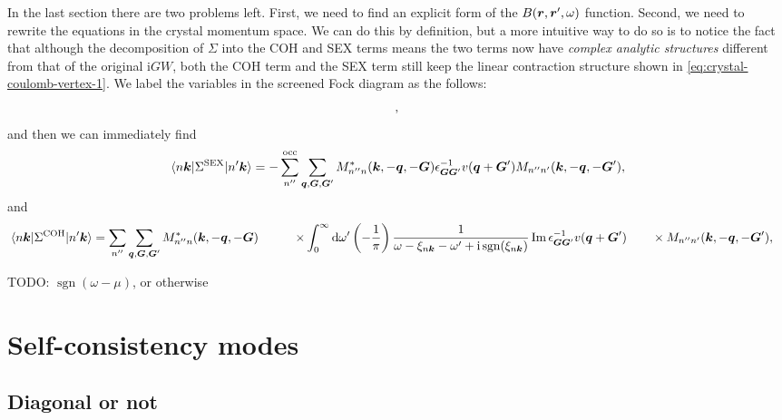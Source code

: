 \documentclass[hyperref, a4paper, 12pt]{report}
\DeclareMathOperator{\sgn}{sgn}
\newcommand*{\ii}{\mathrm{i}}
\def\\{}%
\begin{document}
In the last section there are two problems left.
First, we need to find an explicit form of the $B(\vb*{r}, \vb*{r}', \omega)$ function.
Second, we need to rewrite the equations in the 
crystal momentum space. 
We can do this by definition,
but a more intuitive way to do so 
is to notice the fact that although 
the decomposition of $\Sigma$ into the COH and SEX terms 
means the two terms now have \emph{complex analytic structures} 
different from that of the original $\ii G W$,
both the COH term and the SEX term 
still keep the linear contraction structure 
shown in \eqref{eq:crystal-coulomb-vertex-1}.
We label the variables in the screened Fock diagram as the follows: 
\[
    \protect,
\]
and then we can immediately find 
\begin{equation}
    \mel{n \vb*{k}}{\Sigma^{\text{SEX}}}{n' \vb*{k}}
    = - \sum_{n''}^{\text{occ}} \sum_{\vb*{q}, \vb*{G}, \vb*{G}'}
    M^*_{n'' n} (\vb*{k}, - \vb*{q}, - \vb*{G})  
    \epsilon^{-1}_{\vb*{G} \vb*{G}'} v(\vb*{q} + \vb*{G}') 
    M_{n'' n'} (\vb*{k}, - \vb*{q},  -\vb*{G}'),
\end{equation}
and 
\begin{equation}
    \begin{aligned}
        \mel{n \vb*{k}}{\Sigma^{\text{COH}}}{n' \vb*{k}}
        &= \sum_{n''} \sum_{\vb*{q}, \vb*{G}, \vb*{G}'}
        M^*_{n'' n} (\vb*{k}, - \vb*{q}, - \vb*{G})   \\
        &\quad \quad \times \int_{0}^{\infty} \dd{\omega'} 
        \left(
            - \frac{1}{\pi}
        \right)
        \frac{1}{\omega - \xi_{n \vb*{k}} - \omega' + \ii \sgn(\xi_{n \vb*{k}})}
        \Im \epsilon^{-1}_{\vb*{G} \vb*{G}'} v(\vb*{q}+\vb*{G}') \\
        &\quad \quad \times M_{n'' n'} (\vb*{k}, - \vb*{q},  -\vb*{G}'),
    \end{aligned}
\end{equation}

TODO: $\sgn(\omega - \mu)$, or otherwise

\section{Self-consistency modes}

\subsection{Diagonal or not}
\end{document}
